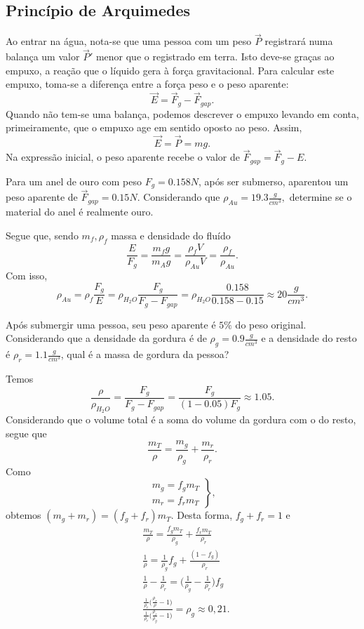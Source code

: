 \documentclass[PhysicsII/physicsII_notes.tex]{subfiles}
\begin{document}
\subsection{Princípio de Arquimedes}
Ao entrar na água, nota-se que uma pessoa com um peso \(\vec{P}\) registrará numa balança um valor \(\vec{P}'\) menor que o registrado em terra. Isto deve-se graças ao empuxo,
a reação que o líquido gera à força gravitacional. Para calcular este empuxo, toma-se a diferença entre a força peso e o peso aparente:
\[
	\vec{E} = \vec{F}_{g}-\vec{F}_{gap}.
\]
Quando não tem-se uma balança, podemos descrever o empuxo levando em conta, primeiramente, que o empuxo age em sentido oposto ao peso. Assim,
\[
	\vec{E} = \vec{P} = mg.
\]
Na expressão inicial, o peso aparente recebe o valor de \(\vec{F}_{gap}=\vec{F}_{g} - E\).
\begin{example}
	Para um anel de ouro com peso \(F_{g} = 0.158N\), após ser submerso, aparentou um peso aparente de \(\vec{F}_{gap}=0.15N\). Considerando que
	\(\rho_{Au} = 19.3\frac{g}{cm^{3}},\) determine se o material do anel é realmente ouro.

	Segue que, sendo \(m_{f}, \rho_{f}\) massa e densidade do fluído
	\[
		\frac{E}{F_{g}} = \frac{m_{f}g}{m_{A}g} = \frac{\rho_{f}V}{\rho_{Au}V} = \frac{\rho_{f}}{\rho_{Au}}.
	\]
	Com isso,
	\[
		\rho_{Au} = \rho_{f}\frac{F_{g}}{E} = \rho_{H_{2}O}\frac{F_{g}}{F_{g}-F_{gap}}=\rho_{H_{2}O}\frac{0.158}{0.158-0.15}\approx 20\frac{g}{cm^{3}}.
	\]
\end{example}
\begin{example}
	Após submergir uma pessoa, seu peso aparente é \(5\%\) do peso original. Considerando que a densidade da gordura é de
	\(\rho_{g} = 0.9 \frac{g}{cm^{3}}\) e a densidade do resto é \(\rho_{r} = 1.1 \frac{g}{cm^{3}}\), qual é a massa de gordura da pessoa?

	Temos
	\[
		\frac{\rho }{\rho_{H_{2}O}} = \frac{F_{g}}{F_{g}-F_{gap}} = \frac{F_{g}}{(1-0.05)F_{g}}\approx 1.05.
	\]
	Considerando que o volume total é a soma do volume da gordura com o do resto, segue que
	\[
		\frac{m_{T}}{\rho }= \frac{m_{g}}{\rho_{g}}+\frac{m_{r}}{\rho_{r}}.
	\]
	Como
	\[
		\left.\begin{array}{ll}
			m_{g} = f_{g}m_{T} \\
			m_{r} = f_{r}m_{T}
		\end{array}\right\},
	\]
	obtemos \((m_{g}+m_{r}) = (f_{g}+f_{r})m_{T}.\) Desta forma, \(f_{g}+f_{r}=1\) e
	\begin{align*}
		 & \frac{m_{T}}{\rho } = \frac{f_{g}m_{T}}{\rho_{g}} + \frac{f_{r}m_{T}}{\rho_{r}}                                                                     \\
		 & \frac{1}{\rho }=\frac{1}{\rho_{g}}f_{g} + \frac{(1-f_{g})}{\rho_{r}}                                                                                \\
		 & \frac{1}{\rho }-\frac{1}{\rho_{r}}=\biggl(\frac{1}{\rho_{g}}-\frac{1}{\rho_{r}}\biggr)f_{g}                                                         \\
		 & \frac{\frac{1}{\rho_{r}}\biggl(\frac{\rho_{r}}{\rho }-1\biggr)}{\frac{1}{\rho_{r}}\biggl(\frac{\rho_{r}}{\rho_{g}}-1\biggr)} = \rho_{g}\approx0,21.
	\end{align*}
\end{example}
\end{document}
